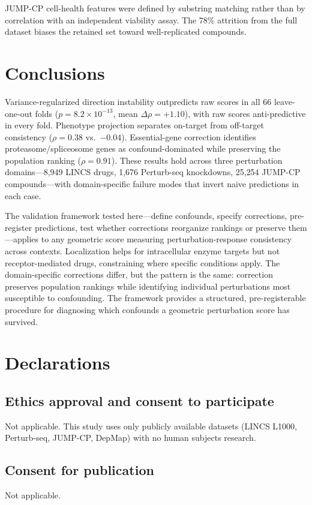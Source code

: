 \documentclass[11pt]{article}
\begin{document}
JUMP-CP cell-health features were defined by substring matching rather
than by correlation with an independent viability assay. The 78\% attrition
from the full dataset biases the retained set toward well-replicated
compounds.

\section{Conclusions}

Variance-regularized direction instability outpredicts raw scores in all 66
leave-one-out folds ($p = 8.2 \times 10^{-13}$, mean
$\Delta\rho = +1.10$), with raw scores anti-predictive in every fold.
Phenotype projection separates on-target from off-target consistency
($\rho = 0.38$ vs.\ $-0.04$). Essential-gene correction identifies
proteasome/spliceosome genes as confound-dominated while preserving the
population ranking ($\rho = 0.91$). These results hold across three
perturbation domains---8{,}949 LINCS drugs, 1{,}676 Perturb-seq
knockdowns, 25{,}254 JUMP-CP compounds---with domain-specific failure
modes that invert naive predictions in each case.

The validation framework tested here---define confounds, specify
corrections, pre-register predictions, test whether corrections reorganize
rankings or preserve them---applies to any geometric score measuring
perturbation-response consistency across contexts. Localization helps for
intracellular enzyme targets but not receptor-mediated drugs, constraining
where specific conditions apply. The domain-specific corrections differ,
but the pattern is the same: correction preserves population rankings while
identifying individual perturbations most susceptible to confounding. The
framework provides a structured, pre-registerable procedure for diagnosing
which confounds a geometric perturbation score has survived.

\section*{Declarations}

\subsection*{Ethics approval and consent to participate}
Not applicable. This study uses only publicly available datasets
(LINCS L1000, Perturb-seq, JUMP-CP, DepMap) with no human subjects
research.

\subsection*{Consent for publication}
Not applicable.
\end{document}
